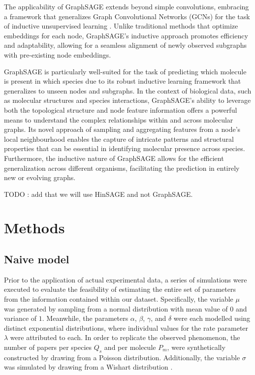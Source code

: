 \documentclass[
11pt, %
english, %
singlespacing, %
headsepline, %
chapterinoneline, %
]{MastersDoctoralThesis} %
\begin{document}
The applicability of GraphSAGE extends beyond simple convolutions, embracing a framework that generalizes Graph Convolutional Networks (GCNs) for the task of inductive unsupervised learning \cite{kipfSemiSupervisedClassificationGraph2016}. Unlike traditional methods that optimize embeddings for each node, GraphSAGE's inductive approach promotes efficiency and adaptability, allowing for a seamless alignment of newly observed subgraphs with pre-existing node embeddings.

GraphSAGE is particularly well-suited for the task of predicting which molecule is present in which species due to its robust inductive learning framework that generalizes to unseen nodes and subgraphs. In the context of biological data, such as molecular structures and species interactions, GraphSAGE's ability to leverage both the topological structure and node feature information offers a powerful means to understand the complex relationships within and across molecular graphs. Its novel approach of sampling and aggregating features from a node's local neighbourhood enables the capture of intricate patterns and structural properties that can be essential in identifying molecular presence across species. Furthermore, the inductive nature of GraphSAGE allows for the efficient generalization across different organisms, facilitating the prediction in entirely new or evolving graphs.


TODO : add that we will use HinSAGE and not GraphSAGE. 

\chapter{Methods}\label{chap:Methods}
\section{Naive model}
Prior to the application of actual experimental data, a series of simulations were executed to evaluate the feasibility of estimating the entire set of parameters from the information contained within our dataset. Specifically, the variable $\mu$ was generated by sampling from a normal distribution with mean value of $0$ and variance of $1$. Meanwhile, the parameters $\alpha$, $\beta$, $\gamma$, and $\delta$ were each modelled using distinct exponential distributions, where individual values for the rate parameter $\lambda$ were attributed to each. In order to replicate the observed phenomenon, the number of papers per species $Q_s$ and per molecule $P_m$, were synthetically constructed by drawing from a Poisson distribution. Additionally, the variable $\sigma$ was simulated by drawing from a Wishart distribution \cite{wishartGENERALISEDPRODUCTMOMENT1928}.
\end{document}
